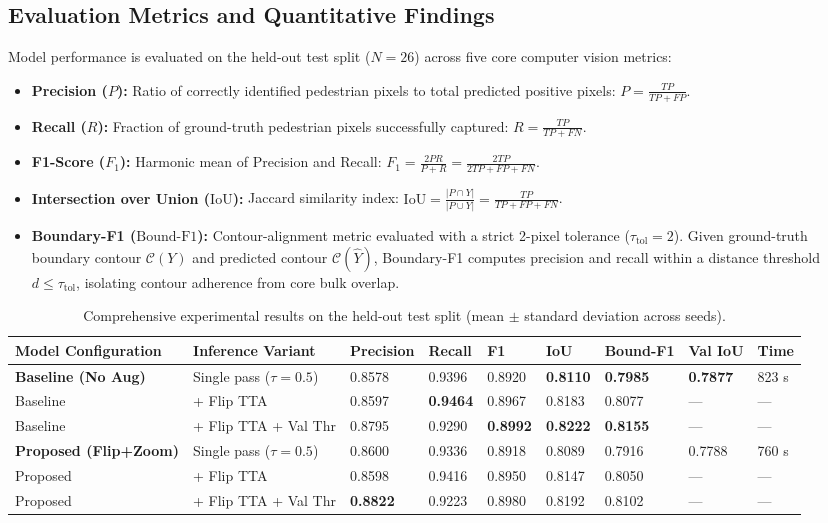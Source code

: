 \documentclass[10pt,a4paper]{article}
\begin{document}
\subsection{Evaluation Metrics and Quantitative Findings}
Model performance is evaluated on the held-out test split ($N=26$) across five core computer vision metrics:
\begin{itemize}
    \item \textbf{Precision ($P$):} Ratio of correctly identified pedestrian pixels to total predicted positive pixels: $P = \frac{TP}{TP + FP}$.
    \item \textbf{Recall ($R$):} Fraction of ground-truth pedestrian pixels successfully captured: $R = \frac{TP}{TP + FN}$.
    \item \textbf{F1-Score ($F_1$):} Harmonic mean of Precision and Recall: $F_1 = \frac{2PR}{P + R} = \frac{2TP}{2TP + FP + FN}$.
    \item \textbf{Intersection over Union ($\text{IoU}$):} Jaccard similarity index: $\text{IoU} = \frac{|P \cap Y|}{|P \cup Y|} = \frac{TP}{TP + FP + FN}$.
    \item \textbf{Boundary-F1 ($\text{Bound-F1}$):} Contour-alignment metric evaluated with a strict 2-pixel tolerance ($\tau_{\text{tol}}=2$). Given ground-truth boundary contour $\mathcal{C}(Y)$ and predicted contour $\mathcal{C}(\widehat{Y})$, Boundary-F1 computes precision and recall within a distance threshold $d \le \tau_{\text{tol}}$, isolating contour adherence from core bulk overlap.
\end{itemize}

\begin{table}[htbp]
\centering
\scriptsize
\setlength{\tabcolsep}{3.2pt}
\caption{Comprehensive experimental results on the held-out test split (mean $\pm$ standard deviation across seeds).}
\label{tab:master_results}
\begin{tabularx}{\linewidth}{l l Y Y Y Y Y Y Y}
\toprule
\textbf{Model Configuration} & \textbf{Inference Variant} & \textbf{Precision} & \textbf{Recall} & \textbf{F1} & \textbf{IoU} & \textbf{Bound-F1} & \textbf{Val IoU} & \textbf{Time} \\
\midrule
\textbf{Baseline (No Aug)} & Single pass ($\tau=0.5$) & 0.8578 & 0.9396 & 0.8920 & \textbf{0.8110} & \textbf{0.7985} & \textbf{0.7877} & 823 s \\
Baseline & + Flip TTA & 0.8597 & \textbf{0.9464} & 0.8967 & 0.8183 & 0.8077 & --- & --- \\
Baseline & + Flip TTA + Val Thr & 0.8795 & 0.9290 & \textbf{0.8992} & \textbf{0.8222} & \textbf{0.8155} & --- & --- \\
\midrule
\textbf{Proposed (Flip+Zoom)} & Single pass ($\tau=0.5$) & 0.8600 & 0.9336 & 0.8918 & 0.8089 & 0.7916 & 0.7788 & 760 s \\
Proposed & + Flip TTA & 0.8598 & 0.9416 & 0.8950 & 0.8147 & 0.8050 & --- & --- \\
Proposed & + Flip TTA + Val Thr & \textbf{0.8822} & 0.9223 & 0.8980 & 0.8192 & 0.8102 & --- & --- \\
\bottomrule
\end{tabularx}
\end{table}
\end{document}
